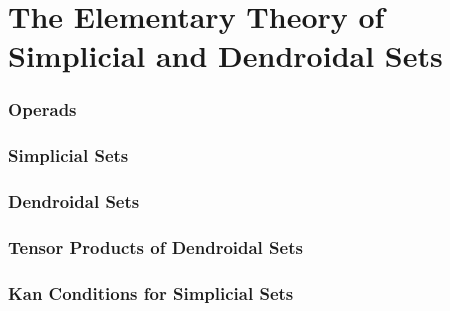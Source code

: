 \documentclass[11pt, a4paper]{article}
\title{\notestitle}
\author{\notesauthor}
\date{\notesdate}
\begin{document}
\maketitle
\tableofcontents
\newpage

\part{The Elementary Theory of Simplicial and Dendroidal Sets}

\section{Operads}

\section{Simplicial Sets}

\section{Dendroidal Sets}

\section{Tensor Products of Dendroidal Sets}

\section{Kan Conditions for Simplicial Sets}
\end{document}
